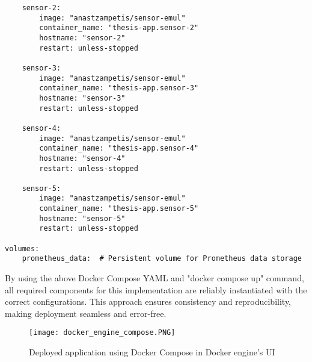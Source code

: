 \begin{verbatim}
    sensor-2:
        image: "anastzampetis/sensor-emul"
        container_name: "thesis-app.sensor-2"
        hostname: "sensor-2"
        restart: unless-stopped

    sensor-3:
        image: "anastzampetis/sensor-emul"
        container_name: "thesis-app.sensor-3"
        hostname: "sensor-3"
        restart: unless-stopped

    sensor-4:
        image: "anastzampetis/sensor-emul"
        container_name: "thesis-app.sensor-4"
        hostname: "sensor-4"
        restart: unless-stopped

    sensor-5:
        image: "anastzampetis/sensor-emul"
        container_name: "thesis-app.sensor-5"
        hostname: "sensor-5"
        restart: unless-stopped

volumes:
    prometheus_data:  # Persistent volume for Prometheus data storage
\end{verbatim}

By using the above Docker Compose YAML and "docker compose up" command, all required components for this implementation are reliably instantiated with the correct configurations. This approach ensures consistency and reproducibility, making deployment seamless and error-free.

\begin{figure}[!h]
    \graphicspath{ {./screenshots/} }
    \texttt{[image: docker\_engine\_compose.PNG]}
    \centering
    \caption{Deployed application using Docker Compose in Docker engine's UI}
    \label{fig:docker_compose}
\end{figure}